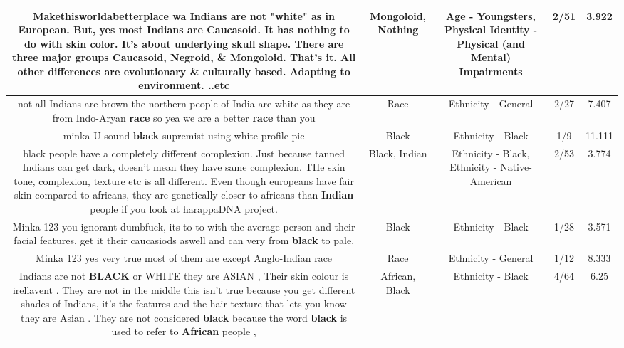 \documentclass[11pt]{article}
\newlength\mylength
\begin{document}
\begin{center}
\begin{longtable}{|C{.65\mylength}|C{.30\mylength}|C{.12\mylength}|C{.12\mylength}|C{.12\mylength}|}
  \small Makethisworldabetterplace wa Indians are not "white" as in European. But, yes most Indians are Caucasoid. It has \textbf{nothing} to do with skin color. It's about underlying skull shape. There are three major groups Caucasoid, Negroid, \& \textbf{Mongoloid}. That's it. All other differences are evolutionary \& culturally based. Adapting to environment. ..etc\normalsize   & Mongoloid, Nothing & Age - Youngsters, Physical Identity - Physical (and Mental) Impairments & 2/51 & 3.922 \\  \hline
  \small not all Indians are brown the northern people of India are white as they are from Indo-Aryan \textbf{race} so yea we are a better \textbf{race} than you\normalsize   & Race & Ethnicity - General & 2/27 & 7.407 \\  \hline
  \small minka U sound \textbf{black} supremist using white profile pic\normalsize   & Black & Ethnicity - Black & 1/9 & 11.111 \\  \hline
  \small black people have a completely different complexion. Just because tanned Indians can get dark, doesn't mean they have same complexion. THe skin tone, complexion, texture etc is all different. Even though europeans have fair skin compared to africans, they are genetically closer to africans than  \textbf{Indian} people if you look at harappaDNA project.\normalsize   & Black, Indian & Ethnicity - Black, Ethnicity - Native-American & 2/53 & 3.774 \\  \hline
  \small Minka 123 you ignorant dumbfuck, its to to with the average person and their facial features, get it their caucasiods aswell and can very from \textbf{black} to pale.\normalsize   & Black & Ethnicity - Black & 1/28 & 3.571 \\  \hline
  \small Minka 123 yes very true most of them are except Anglo-Indian race\normalsize   & Race & Ethnicity - General & 1/12 & 8.333 \\  \hline
  \small Indians are not \textbf{BLACK} or WHITE they are ASIAN , Their skin colour is irellavent . They are not in the middle this isn't true because you get different shades of Indians, it's the features and the hair texture that lets you know they are Asian . They are not considered \textbf{black} because the word \textbf{black} is used to refer to \textbf{African} people ,\normalsize   & African, Black & Ethnicity - Black & 4/64 & 6.25 \\  \hline

\end{longtable}
\end{center}
\end{document}
